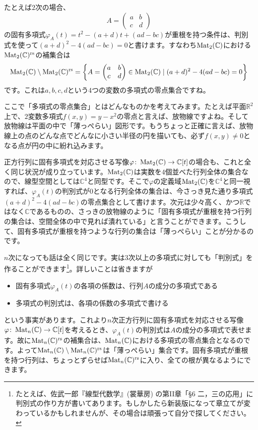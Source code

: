 たとえば$2$次の場合、
\[
A = 
\begin{pmatrix}
a & b \\
c & d
\end{pmatrix}
\]
の固有多項式$\varphi_A(t) = t^2 - (a + d)t + (ad - bc)$が重根を持つ条件は、判別式を使って$(a + d)^2 - 4(ad - bc) = 0$と書けます。すなわち$\operatorname{Mat}_2(\mathbb{C})$における$\operatorname{Mat}_2(\mathbb{C})^{\text{rs}}$の補集合は
\[
\operatorname{Mat}_2(\mathbb{C}) \setminus \operatorname{Mat}_2(\mathbb{C})^{\text{rs}} =
\biggl\{
A = 
\begin{pmatrix}
a & b \\
c & d
\end{pmatrix}
\in \operatorname{Mat}_2(\mathbb{C})
\mid
(a + d)^2 - 4(ad - bc) = 0
\biggr\}
\]
です。これは$a, b, c, d$という$4$つの変数の多項式の零点集合ですね。

ここで「多項式の零点集合」とはどんなものかを考えてみます。たとえば平面$\mathbb{R}^2$上で、$2$変数多項式$f(x, y) = y - x^2$の零点と言えば、放物線ですよね。そして放物線は平面の中で「薄っぺらい」図形です。もうちょっと正確に言えば、放物線上の点のどんな点でどんなに小さい半径の円を描いても、必ず$f(x, y) \neq 0$となる点が円の中に紛れ込みます。

正方行列に固有多項式を対応させる写像$\varphi \colon \operatorname{Mat}_2(\mathbb{C}) \rightarrow \mathbb{C}[t]$の場合も、これと全く同じ状況が成り立っています。$\operatorname{Mat}_2(\mathbb{C})$は実数を$4$個並べた行列全体の集合なので、線型空間としては$\mathbb{C}^4$と同型です。そこで$\varphi$の定義域$\operatorname{Mat}_2(\mathbb{C})$を$\mathbb{C}^4$と同一視すれば、$\varphi_A(t)$の判別式が$0$となる行列全体の集合は、今さっき見た通り多項式$(a + d)^2 - 4(ad - bc)$の零点集合として書けます。次元は少々高く、かつ$\mathbb{R}$ではなく$\mathbb{C}$であるものの、さっきの放物線のように「固有多項式が重根を持つ行列の集合は、空間全体の中で見れば潰れている」と言うことができます。こうして、固有多項式が重根を持つような行列の集合は「薄っぺらい」ことが分かるのです。

$n$次になっても話は全く同じです。実は$3$次以上の多項式に対しても「判別式」を作ることができます\footnote{たとえば、佐武一郎『線型代数学』(裳華房) の第I\negthinspace I章「\S 6 二，三の応用」に判別式の作り方が書いてあります。もしかしたら新装版になって章立てが変わっているかもしれませんが、その場合は頑張って自分で探してください。}。詳しいことは省きますが
\begin{itemize}
\item 固有多項式$\varphi_A(t)$の各項の係数は、行列$A$の成分の多項式である
\item 多項式の判別式は、各項の係数の多項式で書ける
\end{itemize}
という事実があります。これより$n$次正方行列に固有多項式を対応させる写像$\varphi\colon \operatorname{Mat}_n(\mathbb{C}) \rightarrow \mathbb{C}[t]$を考えるとき、$\varphi_A(t)$の判別式は$A$の成分の多項式で表せます。故に$\operatorname{Mat}_n(\mathbb{C})^{\text{rs}}$の補集合は、$\operatorname{Mat}_n(\mathbb{C})$における多項式の零点集合となるのです。よって$\operatorname{Mat}_n(\mathbb{C}) \setminus \operatorname{Mat}_n(\mathbb{C})^{\text{rs}}$は「薄っぺらい」集合です。固有多項式が重根を持つ行列は、ちょっとずらせば$\operatorname{Mat}_n(\mathbb{C})^{\text{rs}}$に入り、全ての根が異なるようにできます。

